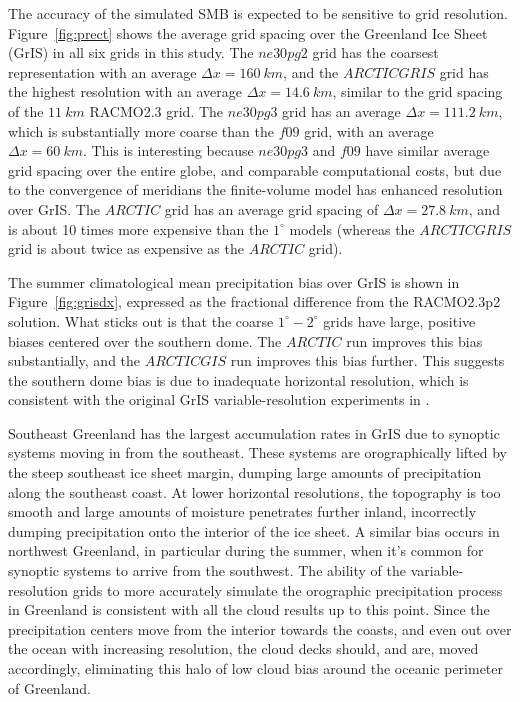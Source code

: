\documentclass[draft]{agujournal2019}
\begin{document}
The accuracy of the simulated SMB is expected to be sensitive to grid resolution. Figure~\ref{fig:prect} shows the average grid spacing over the Greenland Ice Sheet (GrIS) in all six grids in this study. The $ne30pg2$ grid has the coarsest representation with an average $\Delta x=160~km$, and the $ARCTICGRIS$ grid has the highest resolution with an average $\Delta x=14.6~km$, similar to the grid spacing of the $11~km$ RACMO2.3 grid. The $ne30pg3$ grid has an average $\Delta x=111.2~km$, which is substantially more coarse than the $f09$ grid, with an average $\Delta x=60~km$. This is interesting because $ne30pg3$ and $f09$ have similar average grid spacing over the entire globe, and comparable computational costs, but due to the convergence of meridians the finite-volume model has enhanced resolution over GrIS. The $ARCTIC$ grid has an average grid spacing of $\Delta x=27.8~km$, and is about 10 times more expensive than the $1^{\circ}$ models (whereas the $ARCTICGRIS$ grid is about twice as expensive as the $ARCTIC$ grid).

The summer climatological mean precipitation bias over GrIS is shown in Figure~\ref{fig:grisdx}, expressed as the fractional difference from the RACMO2.3p2 solution. What sticks out is that the coarse $1^{\circ}-2^{\circ}$ grids have large, positive biases centered over the southern dome. The $ARCTIC$ run improves this bias substantially, and the $ARCTICGIS$ run improves this bias further. This suggests the southern dome bias is due to inadequate horizontal resolution, which is consistent with the original GrIS variable-resolution experiments in \cite{VETAL2018TC}. 

Southeast Greenland has the largest accumulation rates in GrIS due to synoptic systems moving in from the southeast. These systems are orographically lifted by the steep southeast ice sheet margin, dumping large amounts of precipitation along the southeast coast. At lower horizontal resolutions, the topography is too smooth and large amounts of moisture penetrates further inland, incorrectly dumping precipitation onto the interior of the ice sheet. A similar bias occurs in northwest Greenland, in particular during the summer, when it's common for synoptic systems to arrive from the southwest. The ability of the variable-resolution grids to more accurately simulate the orographic precipitation process in Greenland is consistent with all the cloud results up to this point. Since the precipitation centers move from the interior towards the coasts, and even out over the ocean with increasing resolution, the cloud decks should, and are, moved accordingly, eliminating this halo of low cloud bias around the oceanic perimeter of Greenland.
\end{document}
